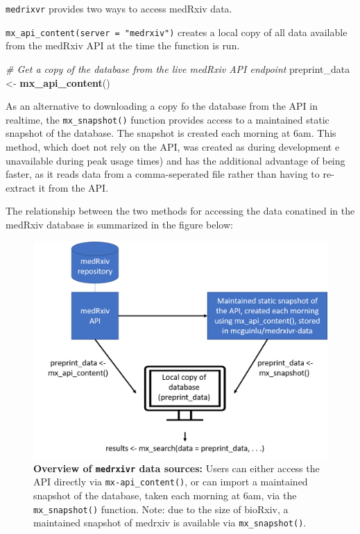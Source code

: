 \documentclass[a4paper, twoside]{templates/ociamthesis}
\newenvironment{Shaded}{\begin{snugshade}}{\end{snugshade}}
\newcommand{\CommentTok}[1]{\textcolor[rgb]{0.56,0.35,0.01}{\textit{#1}}}
\newcommand{\KeywordTok}[1]{\textcolor[rgb]{0.13,0.29,0.53}{\textbf{#1}}}
\newcommand{\NormalTok}[1]{#1}
\newcommand{\StringTok}[1]{\textcolor[rgb]{0.31,0.60,0.02}{#1}}
\renewenvironment{Shaded}
{
  \vspace{4pt}%
  \begin{snugshade}%
}{%
  \end{snugshade}%
  \vspace{4pt}%
}
\begin{document}
\texttt{medrixvr} provides two ways to access medRxiv data.

\texttt{mx\_api\_content(server\ =\ "medrxiv")} creates a local copy of all data available from the medRxiv API at the time the function is run.

\begin{Shaded}
\begin{Highlighting}[]
\CommentTok{# Get a copy of the database from the live medRxiv API endpoint}
\NormalTok{preprint_data <-}\StringTok{ }\KeywordTok{mx_api_content}\NormalTok{()  }
\end{Highlighting}
\end{Shaded}

As an alternative to downloading a copy fo the database from the API in realtime, the \texttt{mx\_snapshot()} function provides access to a maintained static snapshot of the database. The snapshot is created each morning at 6am. This method, which doet not rely on the API, was created as during development e unavailable during peak usage times) and has the additional advantage of being faster, as it reads data from a comma-seperated file rather than having to re-extract it from the API.

The relationship between the two methods for accessing the data conatined in the medRxiv database is summarized in the figure below:





\begin{figure}
\includegraphics[width=1\linewidth]{figures/sys-rev-tools/data_sources} \caption[Overview of \texttt{medrxivr} data sources]{\textbf{Overview of \texttt{medrxivr} data sources:} Users can either access the API directly via \texttt{mx-api\_content()}, or can import a maintained snapshot of the database, taken each morning at 6am, via the \texttt{mx\_snapshot()} function. Note: due to the size of bioRxiv, a maintained snapshot of medrxiv is available via \texttt{mx\_snapshot()}.}\label{fig:medrxivr-data-sources}
\end{figure}
\end{document}
